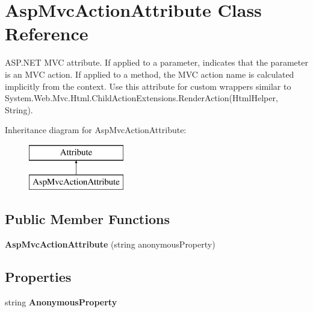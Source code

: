 \hypertarget{class_asp_mvc_action_attribute}{}\section{Asp\+Mvc\+Action\+Attribute Class Reference}
\label{class_asp_mvc_action_attribute}


A\+S\+P.\+N\+E\+T M\+V\+C attribute. If applied to a parameter, indicates that the parameter is an M\+V\+C action. If applied to a method, the M\+V\+C action name is calculated implicitly from the context. Use this attribute for custom wrappers similar to {\ttfamily System.\+Web.\+Mvc.\+Html.\+Child\+Action\+Extensions.\+Render\+Action(\+Html\+Helper, String)}.  


Inheritance diagram for Asp\+Mvc\+Action\+Attribute\+:\begin{figure}[H]
\begin{center}
\leavevmode
\includegraphics[height=2.000000cm]{class_asp_mvc_action_attribute}
\end{center}
\end{figure}
\subsection*{Public Member Functions}
\begin{DoxyCompactItemize}
\item 
\hypertarget{class_asp_mvc_action_attribute_a2f39095bf0a497897fbbc76e96621ff0}{}{\bfseries Asp\+Mvc\+Action\+Attribute} (string anonymous\+Property)\label{class_asp_mvc_action_attribute_a2f39095bf0a497897fbbc76e96621ff0}

\end{DoxyCompactItemize}
\subsection*{Properties}
\begin{DoxyCompactItemize}
\item 
\hypertarget{class_asp_mvc_action_attribute_a7068fa64becd1bc3de4622e5a50b0a49}{}string {\bfseries Anonymous\+Property}\label{class_asp_mvc_action_attribute_a7068fa64becd1bc3de4622e5a50b0a49}

\end{DoxyCompactItemize}


